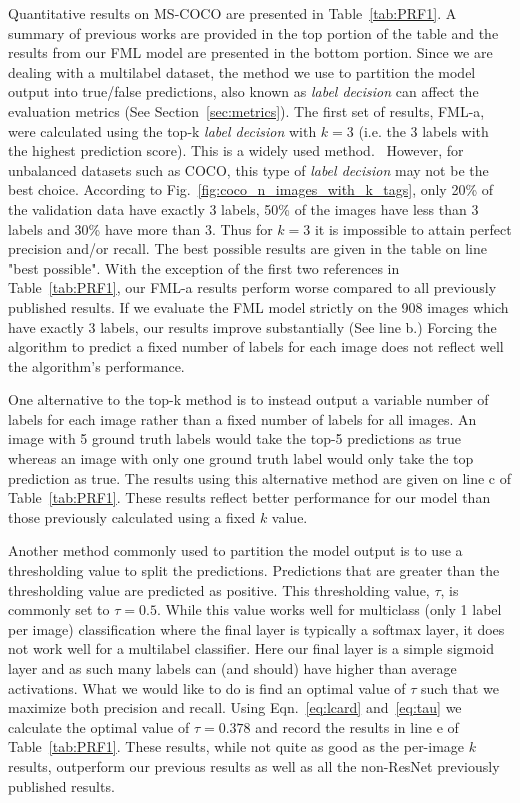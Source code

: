 \documentclass[12pt,journal,compsoc]{IEEEtran}
\begin{document}
Quantitative results on MS-COCO are presented in Table~\ref{tab:PRF1}. A summary of previous works are provided in the top portion of the table and the results from our FML model are presented in the bottom portion. Since we are dealing with a multilabel dataset, the method we use to partition the model output into true/false predictions, also known as \textit{label decision} can affect the evaluation metrics (See Section~\ref{sec:metrics}). The first set of results, FML-a, were calculated using the top-k \textit{label decision} with $k=3$ (i.e. the 3 labels with the highest prediction score).  This is a widely used method.~\cite{WangYMHHX16,ZhuLOYW17}  However, for unbalanced datasets such as COCO, this type of \textit{label decision} may not be the best choice. According to Fig.~\ref{fig:coco_n_images_with_k_tags}, only 20\% of the validation data have exactly 3 labels, 50\% of the images have less than 3 labels and 30\% have more than 3. Thus for $k=3$ it is impossible to attain perfect precision and/or recall. The best possible results are given in the table on line "best possible".  With the exception of the first two references in Table~\ref{tab:PRF1}, our FML-a results perform worse compared to all previously published results. If we evaluate the FML model strictly on the 908 images which have exactly 3 labels, our results improve substantially (See line b.) Forcing the algorithm to predict a fixed number of labels for each image does not reflect well the algorithm's performance.

One alternative to the top-k method is to instead output a variable number of labels for each image rather than a fixed number of labels for all images. An image with 5 ground truth labels would take the top-5 predictions as true whereas an image with only one ground truth label would only take the top prediction as true.  The results using this alternative method are given on line c of Table~\ref{tab:PRF1}. These results reflect better performance for our model than those previously calculated using a fixed $k$ value.

Another method commonly used to partition the model output is to use a thresholding value to split the predictions. Predictions that are greater than the thresholding value are predicted as positive. This thresholding value, $\tau$, is commonly set to $\tau = 0.5$. While this value works well for multiclass (only 1 label per image) classification where the final layer is typically a softmax layer, it does not work well for a multilabel classifier. Here our final layer is a simple sigmoid layer and as such many labels can (and should) have higher than average activations.  What we would like to do is find an optimal value of $\tau$ such that we maximize both precision and recall. Using Eqn.~\ref{eq:lcard} and~\ref{eq:tau} we calculate the optimal value of $\tau = 0.378$ and record the results in line e of Table~\ref{tab:PRF1}. These results, while not quite as good as the per-image $k$ results, outperform our previous results as well as all the non-ResNet previously published results.
\end{document}
